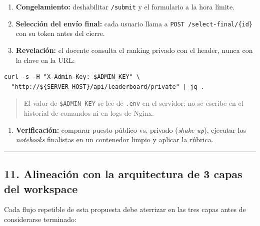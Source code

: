 \documentclass[11pt,a4paper]{article}
\providecommand{\tightlist}{%
  \setlength{\itemsep}{0pt}\setlength{\parskip}{0pt}}
\begin{document}
\begin{enumerate}
\def\labelenumi{\arabic{enumi}.}
\tightlist
\item
  \textbf{Congelamiento:} deshabilitar \texttt{/\allowbreak{}submit} y el formulario a la hora límite.
\item
  \textbf{Selección del envío final:} cada usuario llama a \texttt{POST\ /select-final/\{id\}} con su token antes del cierre.
\item
  \textbf{Revelación:} el docente consulta el ranking privado con el header, nunca con la clave en la URL:
\end{enumerate}

\begin{lstlisting}
curl -s -H "X-Admin-Key: $ADMIN_KEY" \
  "http://${SERVER_HOST}/api/leaderboard/private" | jq .
\end{lstlisting}

\begin{quote}
El valor de \texttt{\$ADMIN\_\allowbreak{}KEY} se lee de \texttt{.\allowbreak{}env} en el servidor; no se escribe en el historial de comandos ni en logs de Nginx.
\end{quote}

\begin{enumerate}
\def\labelenumi{\arabic{enumi}.}
\setcounter{enumi}{3}
\tightlist
\item
  \textbf{Verificación:} comparar puesto público vs. privado (\emph{shake-up}), ejecutar los \emph{notebooks} finalistas en un contenedor limpio y aplicar la rúbrica.
\end{enumerate}

\begin{center}\rule{0.5\linewidth}{0.5pt}\end{center}

\hypertarget{11-alineaciuxf3n-con-la-arquitectura-de-3-capas-del-workspace}{%
\subsection{11. Alineación con la arquitectura de 3 capas del workspace}\label{11-alineaciuxf3n-con-la-arquitectura-de-3-capas-del-workspace}}

Cada flujo repetible de esta propuesta debe aterrizar en las tres capas antes de considerarse terminado:
\end{document}
